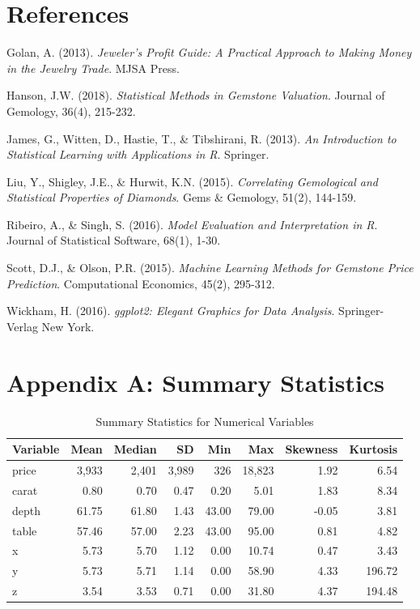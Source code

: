 \documentclass[11pt,a4paper]{article}
\begin{document}
\section{References}

\begin{thebibliography}{9}

Golan, A. (2013). 
\textit{Jeweler's Profit Guide: A Practical Approach to Making Money in the Jewelry Trade}. 
MJSA Press.

Hanson, J.W. (2018). 
\textit{Statistical Methods in Gemstone Valuation}. 
Journal of Gemology, 36(4), 215-232.

James, G., Witten, D., Hastie, T., \& Tibshirani, R. (2013). 
\textit{An Introduction to Statistical Learning with Applications in R}. 
Springer.

Liu, Y., Shigley, J.E., \& Hurwit, K.N. (2015). 
\textit{Correlating Gemological and Statistical Properties of Diamonds}. 
Gems \& Gemology, 51(2), 144-159.

Ribeiro, A., \& Singh, S. (2016). 
\textit{Model Evaluation and Interpretation in R}. 
Journal of Statistical Software, 68(1), 1-30.

Scott, D.J., \& Olson, P.R. (2015). 
\textit{Machine Learning Methods for Gemstone Price Prediction}. 
Computational Economics, 45(2), 295-312.

Wickham, H. (2016). 
\textit{ggplot2: Elegant Graphics for Data Analysis}. 
Springer-Verlag New York.

\end{thebibliography}

\appendix

\section{Appendix A: Summary Statistics}

\begin{table}[ht]
\centering
\caption{Summary Statistics for Numerical Variables}
\begin{tabular}{lrrrrrrr}
\toprule
Variable & Mean & Median & SD & Min & Max & Skewness & Kurtosis \\
\midrule
price & 3,933 & 2,401 & 3,989 & 326 & 18,823 & 1.92 & 6.54 \\
carat & 0.80 & 0.70 & 0.47 & 0.20 & 5.01 & 1.83 & 8.34 \\
depth & 61.75 & 61.80 & 1.43 & 43.00 & 79.00 & -0.05 & 3.81 \\
table & 57.46 & 57.00 & 2.23 & 43.00 & 95.00 & 0.81 & 4.82 \\
x & 5.73 & 5.70 & 1.12 & 0.00 & 10.74 & 0.47 & 3.43 \\
y & 5.73 & 5.71 & 1.14 & 0.00 & 58.90 & 4.33 & 196.72 \\
z & 3.54 & 3.53 & 0.71 & 0.00 & 31.80 & 4.37 & 194.48 \\
\bottomrule
\end{tabular}
\end{table}
\end{document}
